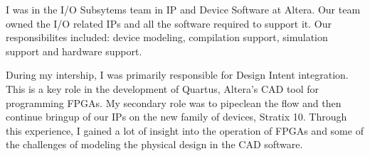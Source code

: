 I was in the I/O Subsytems team in IP and Device Software at Altera. Our team owned the I/O related IPs and all the software required to support it. Our responsibilites included: device modeling, compilation support, simulation support and hardware support.

During my intership, I was primarily responsible for Design Intent integration.  This is a key role in the development of Quartus, Altera's CAD tool for programming FPGAs. My secondary role was to pipeclean the flow and then continue bringup of our IPs on the new family of devices, Stratix 10. Through this experience, I gained a lot of insight into the operation of FPGAs and some of the challenges of modeling the physical design in the CAD software.
